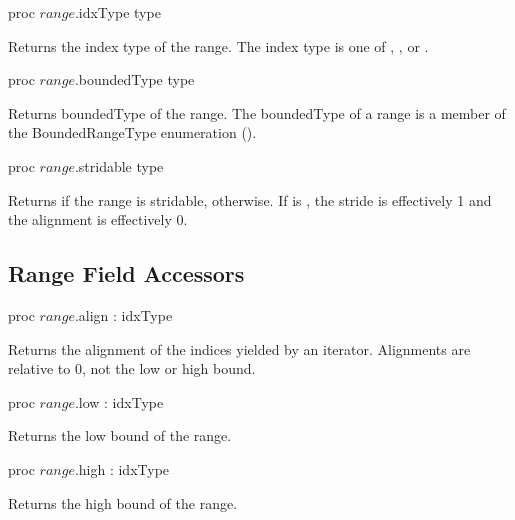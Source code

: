 \begin{protohead}
proc $range$.idxType type
\end{protohead}
\begin{protobody}
Returns the index type of the range.  The index type is one
of , ,  or .
\end{protobody}

\begin{protohead}
proc $range$.boundedType type
\end{protohead}
\begin{protobody}
Returns boundedType of the range.  The boundedType of a range is a member of the
BoundedRangeType enumeration ().
\end{protobody}

\begin{protohead}
proc $range$.stridable type
\end{protohead}
\begin{protobody}
Returns  if the range is stridable,  otherwise.  If  is
, the stride is effectively 1 and the alignment is effectively 0.
\end{protobody}

\subsection{Range Field Accessors}

\begin{protohead}
proc $range$.align : idxType
\end{protohead}
\begin{protobody}
Returns the alignment of the indices yielded by an iterator.  Alignments are
relative to 0, not the low or high bound.
\end{protobody}

\begin{protohead}
proc $range$.low : idxType
\end{protohead}
\begin{protobody}
Returns the low bound of the range.
\end{protobody}

\begin{protohead}
proc $range$.high : idxType
\end{protohead}
\begin{protobody}
Returns the high bound of the range.
\end{protobody}

